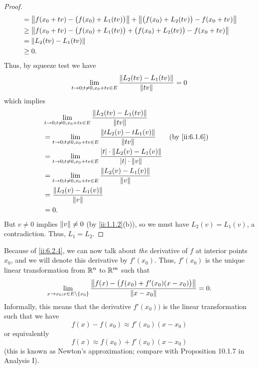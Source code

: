 \begin{proof}
\begin{align*}
     & = \norm*{f(x_0 + tv) - \big(f(x_0) + L_1(tv)\big)} + \norm*{\big(f(x_0) + L_2(tv)\big) - f(x_0 + tv)} \\
     & \geq \norm*{f(x_0 + tv) - \big(f(x_0) + L_1(tv)\big) + \big(f(x_0) + L_2(tv)\big) - f(x_0 + tv)}      \\
     & = \norm*{L_2(tv) - L_1(tv)}                                                                           \\
     & \geq 0.
  \end{align*}
  Thus, by squeeze test we have
  \[
    \lim_{t \to 0 ; t \neq 0, x_0 + tv \in E} \dfrac{\norm*{L_2(tv) - L_1(tv)}}{\norm*{tv}} = 0
  \]
  which implies
  \begin{align*}
     & \lim_{t \to 0 ; t \neq 0, x_0 + tv \in E} \dfrac{\norm*{L_2(tv) - L_1(tv)}}{\norm*{tv}}                                               \\
     & = \lim_{t \to 0 ; t \neq 0, x_0 + tv \in E} \dfrac{\norm*{t L_2(v) - t L_1(v)}}{\norm*{tv}}                        &  & \by{ii:6.1.6} \\
     & = \lim_{t \to 0 ; t \neq 0, x_0 + tv \in E} \dfrac{\abs{t} \cdot \norm*{L_2(v) - L_1(v)}}{\abs{t} \cdot \norm*{v}}                    \\
     & = \lim_{t \to 0 ; t \neq 0, x_0 + tv \in E} \dfrac{\norm*{L_2(v) - L_1(v)}}{\norm*{v}}                                                \\
     & = \dfrac{\norm*{L_2(v) - L_1(v)}}{\norm*{v}}                                                                                          \\
     & = 0.
  \end{align*}
  But \(v \neq 0\) implies \(\norm*{v} \neq 0\) (by \cref{ii:1.1.2}(b)), so we must have \(L_2(v) = L_1(v)\), a contradiction.
  Thus, \(L_1 = L_2\).
\end{proof}

\begin{note}
  Because of \cref{ii:6.2.4}, we can now talk about \emph{the} derivative of \(f\) at interior points \(x_0\), and we will denote this derivative by \(f'(x_0)\).
  Thus, \(f'(x_0)\) is the unique linear transformation from \(\R^n\) to \(\R^m\) such that
  \[
    \lim_{x \to x_0 ; x \in E \setminus \set{x_0}} \dfrac{\norm*{f(x) - \big(f(x_0) + f'(x_0)(x - x_0)\big)}}{\norm*{x - x_0}} = 0.
  \]
  Informally, this means that the derivative \(f'(x_0))\) is the linear transformation such that we have
  \[
    f(x) - f(x_0) \approx f'(x_0)(x - x_0)
  \]
  or equivalently
  \[
    f(x) \approx f(x_0) + f'(x_0)(x - x_0)
  \]
  (this is known as Newton's approximation;
  compare with Proposition 10.1.7 in Analysis I).
\end{note}

